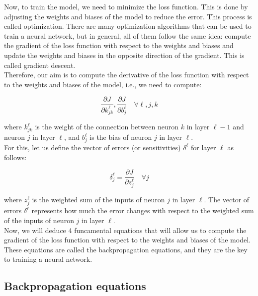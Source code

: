Now, to train the model, we need to minimize the loss function. This is done by
adjusting the weights and biases of the model to reduce the error. This process
is called optimization. There are many optimization algorithms that can be used
to train a neural network, but in general, all of them follow the same idea:
compute the gradient of the loss function with respect to the weights and biases
and update the weights and biases in the opposite direction of the gradient.
This is called gradient descent.\\

Therefore, our aim is to compute the derivative of the loss function with respect
to the weights and biases of the model, i.e., we need to compute:

\begin{equation}
    \frac{\partial J}{\partial k^\ell_{jk}}, \frac{\partial J}{\partial b^\ell_j} \quad \forall \ell, j, k
\end{equation}

where $k^\ell_{jk}$ is the weight of the connection between neuron $k$ in layer $\ell-1$
and neuron $j$ in layer $\ell$, and $b^\ell_j$ is the bias of neuron $j$ in layer $\ell$.\\

For this, let us define the vector of errors (or sensitivities) $\delta^\ell$ for 
layer $\ell$ as follows:

\begin{equation}
    \delta^\ell_j = \frac{\partial J}{\partial z^\ell_j} \quad \forall j
\end{equation}

where $z^\ell_j$ is the weighted sum of the inputs of neuron $j$ in layer $\ell$.
The vector of errors $\delta^\ell$ represents how much the error changes with respect
to the weighted sum of the inputs of neuron $j$ in layer $\ell$.\\

Now, we will deduce 4 funcamental equations that will allow us to compute the
gradient of the loss function with respect to the weights and biases of the model.
These equations are called the backpropagation equations, and they are the key
to training a neural network.\\

\subsection{Backpropagation equations}


